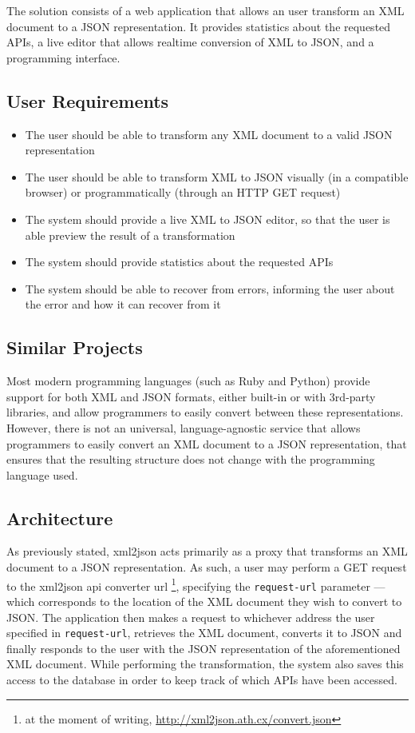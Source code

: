 \documentclass[twocolumn,twoside,10pt,a4paper]{article}
\begin{document}
The solution consists of a web application that allows an user transform an XML document to a JSON representation. It provides statistics about the requested APIs, a live editor that allows realtime conversion of XML to JSON, and a programming interface.

\subsection{User Requirements}\label{sec:user-requirements}

\begin{itemize}
    \item The user should be able to transform any XML document to a valid JSON representation
    \item The user should be able to transform XML to JSON visually (in a compatible browser) or programmatically (through an HTTP GET request)
    \item The system should provide a live XML to JSON editor, so that the user is able preview the result of a transformation
    \item The system should provide statistics about the requested APIs
    \item The system should be able to recover from errors, informing the user about the error and how it can recover from it
\end{itemize}

\subsection{Similar Projects}\label{sec:similar-projects}

Most modern programming languages (such as Ruby and Python) provide support for both XML and JSON formats, either built-in or with 3rd-party libraries, and allow programmers to easily convert between these representations. However, there is not an universal, language-agnostic service that allows programmers to easily convert an XML document to a JSON representation, that ensures that the resulting structure does not change with the programming language used.

\subsection{Architecture}\label{sec:architecture}

As previously stated, xml2json acts primarily as a proxy that transforms an XML document to a JSON representation. As such, a user may perform a GET request to the xml2json api converter url \footnote{at the moment of writing, \url{http://xml2json.ath.cx/convert.json}}, specifying the \verb!request-url! parameter --- which corresponds to the location of the XML document they wish to convert to JSON. The application then makes a request to whichever address the user specified in \verb!request-url!, retrieves the XML document, converts it to JSON and finally responds to the user with the JSON representation of the aforementioned XML document. While performing the transformation, the system also saves this access to the database in order to keep track of which APIs have been accessed.
\end{document}
